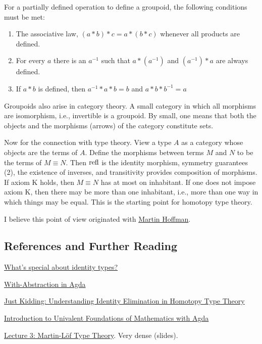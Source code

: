 For a partially defined operation to define a groupoid, the following conditions must be met:

\begin{enumerate}

\item The associative law, $(a*b)*c = a*(b*c)$ whenever all products are defined.

\item For every $a$ there is an $a^{-1}$ such that  $a*(a^{-1})$ and  $(a^{-1})*a$ are always defined.

\item  If $a*b$ is defined, then $a^{-1}*a*b = b$ and $a*b*b^ {-1} = a$

\end{enumerate}


Groupoids also arise in category theory.  A small category in which all morphisms are isomorphism, i.e., invertible is a groupoid.  By small, one means that both the objects and the morphisms (arrows) of the category constitute sets.

Now for the connection with type theory.  View a type $A$ as a category whose objects are the terms of $A$.  Define the morphisms between terms $M$ and $N$ to be the terms of $M \equiv N$.  Then $\mathop{\text{refl}}$ is the identity morphism, symmetry guarantees (2), the existence of inverses, and transitivity provides composition of morphisms.  If axiom K holds, then $M \equiv N$ has at most on inhabitant.  If one does not impose axiom K, then there may be more than one inhabitant, i.e., more than one way in which things may be equal.  This is the starting point for homotopy type theory.

I believe this point of view originated with \href{https://ncatlab.org/homotopytypetheory/files/HofmannDMV.pdf}{Martin Hoffman}.


\subsection{References and Further Reading}

\href{https://homotopytypetheory.org/2011/04/18/whats-special-about-identity-types/}{What's special about identity types?}

\href{https://agda.readthedocs.io/en/v2.6.1/language/with-abstraction.html}{With-Abstraction in Agda}

\href{https://homotopytypetheory.org/2011/04/10/just-kidding-understanding-identity-elimination-in-homotopy-type-theory/}{Just Kidding: Understanding Identity Elimination in Homotopy Type Theory}

\href{https://www.cs.bham.ac.uk/~mhe/HoTT-UF-in-Agda-Lecture-Notes/index.html}{Introduction to Univalent Foundations of Mathematics with Agda}

\href{http://www.cse.chalmers.se/~abela/esslli2016/talkESSLLI3.pdf}{Lecture 3: Martin-Löf Type Theory}.  Very dense (slides).